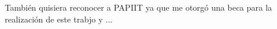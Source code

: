 
\begin{acknowledgements}

También quisiera reconocer a PAPIIT ya que me otorgó una beca para la realización de este trabjo y ...
\end{acknowledgements}




